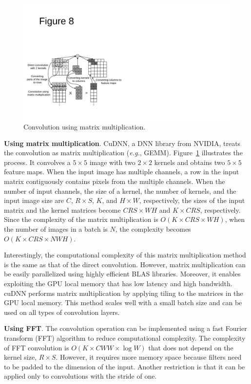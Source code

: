 \begin{figure}[htbp]
  \centering
  \includegraphics[width=\linewidth]{./figures/matmul}
  \caption{Convolution using matrix multiplication.}
  \label{fig_matmul}
\end{figure}

{\bf Using matrix multiplication}. CuDNN\cite{cudnn}, a DNN library from NVIDIA, treats the convolution as matrix multiplication (\textit{e.g.}, GEMM\cite{cublas}). Figure~\ref{fig_matmul} illustrates the process. It convolves a $5 \times 5$ image with two $2 \times 2$ kernels and obtains two $5 \times 5$ feature maps. When the input image has multiple channels, a row in the input matrix contiguously contains pixels from the multiple channels. When the number of input channels, the size of a kernel, the number of kernels, and the input image size are $C$, $R \times S$, $K$, and $H \times W$, respectively, the sizes of the input matrix and the kernel matrices become $CRS \times WH$ and $K \times CRS$, respectively. Since the complexity of the matrix multiplication is $O(K \times CRS \times WH)$, when the number of images in a batch is $N$, the complexity becomes $O(K \times CRS \times NWH)$. 

Interestingly, the computational complexity of this matrix multiplication method is the same as that of the direct convolution. However, matrix multiplication can be easily parallelized using highly efficient BLAS libraries\cite{cublas}. Moreover, it enables exploiting the GPU local memory that has  low latency and high bandwidth. cuDNN performs matrix multiplication by applying tiling to the matrices in the GPU local memory. This method scales well with a small batch size and can be used on all types of convolution layers. 

{\bf Using FFT}. The convolution operation can be implemented using a fast Fourier transform (FFT) algorithm to reduce computational complexity\cite{fftconv}. The complexity of FFT convolution is $O(K \times CWW \times \log W)$ that does not depend on the kernel size, $R \times S$. However, it requires more memory space because filters need to be padded to the dimension of the input. Another restriction is that it can be applied only to convolutions with the stride of one.

